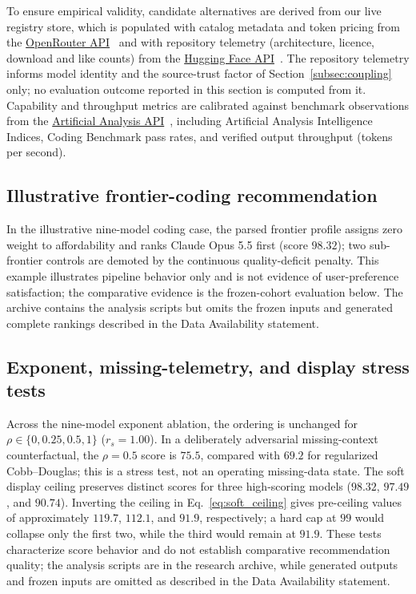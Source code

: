 \documentclass[pdflatex,sn-mathphys-num]{sn-jnl}
\theoremstyle{thmstyleone}
\theoremstyle{thmstylethree}
\begin{document}
To ensure empirical validity, candidate alternatives are derived from our live registry store, which is populated with catalog metadata and token pricing from the \href{https://openrouter.ai/docs/api-reference/overview}{OpenRouter API}~\cite{openrouter2024} and with repository telemetry (architecture, licence, download and like counts) from the \href{https://huggingface.co/docs/hub/api}{Hugging Face API}~\cite{hf2023}. The repository telemetry informs model identity and the source-trust factor of Section~\ref{subsec:coupling} only; no evaluation outcome reported in this section is computed from it. Capability and throughput metrics are calibrated against benchmark observations from the \href{https://artificialanalysis.ai/api-reference}{Artificial Analysis API}~\cite{aa2024}, including Artificial Analysis Intelligence Indices, Coding Benchmark pass rates, and verified output throughput (tokens per second).

\subsection{Illustrative frontier-coding recommendation}\label{subsec:coding_case}

In the illustrative nine-model coding case, the parsed frontier profile assigns zero weight to affordability and ranks Claude Opus 5.5 first (score $98.32$); two sub-frontier controls are demoted by the continuous quality-deficit penalty. This example illustrates pipeline behavior only and is not evidence of user-preference satisfaction; the comparative evidence is the frozen-cohort evaluation below. The archive contains the analysis scripts but omits the frozen inputs and generated complete rankings described in the Data Availability statement.

\subsection{Exponent, missing-telemetry, and display stress tests}\label{subsec:ablation}

Across the nine-model exponent ablation, the ordering is unchanged for $\rho\in\{0,0.25,0.5,1\}$ ($r_s=1.00$). In a deliberately adversarial missing-context counterfactual, the $\rho=0.5$ score is $75.5$, compared with $69.2$ for regularized Cobb--Douglas; this is a stress test, not an operating missing-data state. The soft display ceiling preserves distinct scores for three high-scoring models ($98.32$, $97.49$, and $90.74$). Inverting the ceiling in Eq.~\ref{eq:soft_ceiling} gives pre-ceiling values of approximately $119.7$, $112.1$, and $91.9$, respectively; a hard cap at $99$ would collapse only the first two, while the third would remain at $91.9$. These tests characterize score behavior and do not establish comparative recommendation quality; the analysis scripts are in the research archive, while generated outputs and frozen inputs are omitted as described in the Data Availability statement.
\end{document}
